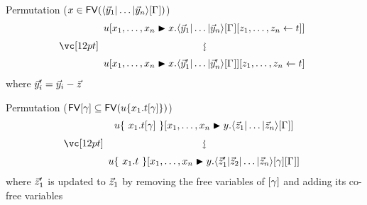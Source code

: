 \documentclass{amsart}
\begin{document}
\bigskip
\bigskip
\bigskip

\noindent
Permutation ($x\in\FV(\ttup*y\G)$)
\[
\displayrewrite
  { u\diistr xx{\ttup*y\G\share zt} }
  { u\diistr xx{\ttup{\vv*y'}\G}\share zt }
\]
where $\vv*y'_i=\vv*y_i-\vv*z$

\bigskip
\bigskip
\bigskip


\noindent
Permutation ($\FV\g\subseteq\FV(u\cxt*{x_1.t\g})$)
\[
\displayrewrite
  { u\cxt*{~x_1.t\g~}\diistr xy{\ttup*z\G} }
  { u\cxt*{~x_1.t~}\diistr xy{\tup*{\vv*z'_1|\vv*z_2|\dotso|\vv*z_n}\g\G} }
\]
where $\vv*z'_1$ is updated to $\vv*z_1$ by removing the free variables of $\g$ and adding its co-free variables
\end{document}
